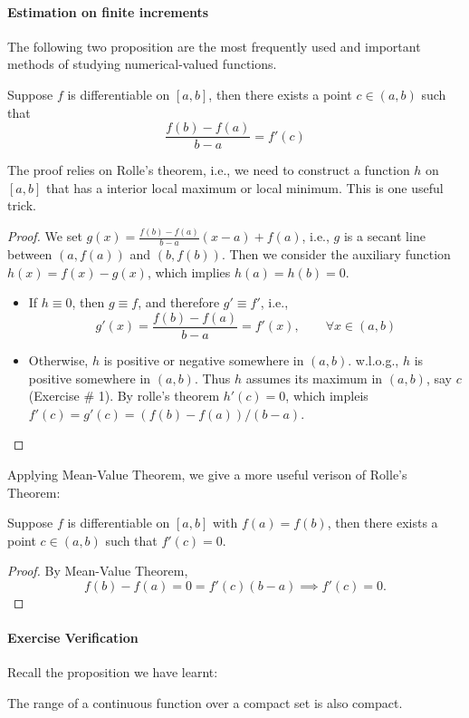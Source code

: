 \paragraph{Estimation on finite increments}
The following two proposition are the most frequently used and important methods of studying numerical-valued functions.
\begin{theorem}
Suppose $f$ is differentiable on $[a,b]$, then there exists a point $c\in (a,b)$ such that
\[
\frac{f(b) - f(a)}{b-a}=f'(c)
\]
\label{The:5:2}
\end{theorem}
The proof relies on Rolle's theorem, i.e., we need to construct a function $h$ on $[a,b]$ that has a interior local maximum or local minimum. This is one useful trick.
\begin{proof}
We set $g(x) = \frac{f(b)  - f(a)}{b-a}(x-a)+f(a)$, i.e., $g$ is a secant line between $(a,f(a))$ and $(b,f(b))$. Then we consider the auxiliary function $h(x)=f(x)-g(x)$, which implies $h(a)=h(b)=0$.
\begin{itemize}
\item
If $h\equiv0$, then $g\equiv f$, and therefore $g'\equiv f'$, i.e., 
\[
g'(x)=\frac{f(b) - f(a)}{b-a}=f'(x), \qquad\forall x\in(a,b)
\]
\item
Otherwise, $h$ is positive or negative somewhere in $(a,b)$. w.l.o.g., $h$ is positive somewhere in $(a,b)$. Thus $h$ assumes its maximum in $(a,b)$, say $c$ (Exercise $\#$ 1). By rolle's theorem $h'(c)=0$, which impleis $f'(c) = g'(c)=(f(b) - f(a))/(b-a).$
\end{itemize}
\end{proof}
Applying Mean-Value Theorem, we give a more useful verison of Rolle's Theorem:
\begin{corollary}
Suppose $f$ is differentiable on $[a,b]$ with $f(a)=f(b)$, then there exists a point $c\in(a,b)$ such that $f'(c)=0$.
\label{Cor:5:1}
\end{corollary}
\begin{proof}
By Mean-Value Theorem,
\[
f(b)-f(a)=0=f'(c)(b-a)\implies f'(c)=0.
\]
\end{proof}

\paragraph{Exercise Verification}
Recall the proposition we have learnt:
\begin{proposition}
The range of a continuous function over a compact set is also compact.
\end{proposition}

